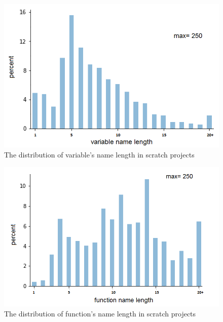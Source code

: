 \documentclass[conference]{IEEEtran}
\begin{document}
\begin{figure}[tb]
	\begin{center}
		\includegraphics[width=\columnwidth]{fig/varname_length_occurrences}
		\caption{The distribution of variable's name length in scratch projects}
		\label{fig:distribution_of_lengths}
	\end{center}
\end{figure} 
\begin{figure}[tb]
	\begin{center}
		\includegraphics[width=\columnwidth]{fig/funcname_length_occurrence}
		\caption{The distribution of function's name length in scratch projects}
		\label{fig:distribution_of_lengths_func}
	\end{center}
\end{figure} 
\end{document}
